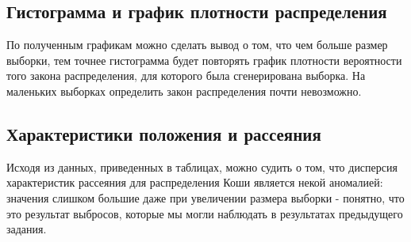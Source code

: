 \subsection{Гистограмма и график плотности распределения}
	По полученным графикам можно сделать вывод о том, что чем больше размер выборки, тем точнее гистограмма будет повторять график плотности вероятности того закона распределения, для которого была сгенерирована выборка. На маленьких выборках определить закон распределения почти невозможно.
\subsection{Характеристики положения и рассеяния}
	Исходя из данных, приведенных в таблицах, можно судить о том, что дисперсия характеристик рассеяния для распределения Коши является некой аномалией: значения слишком большие даже при увеличении размера выборки - понятно, что это результат выбросов, которые мы могли наблюдать в результатах предыдущего задания.